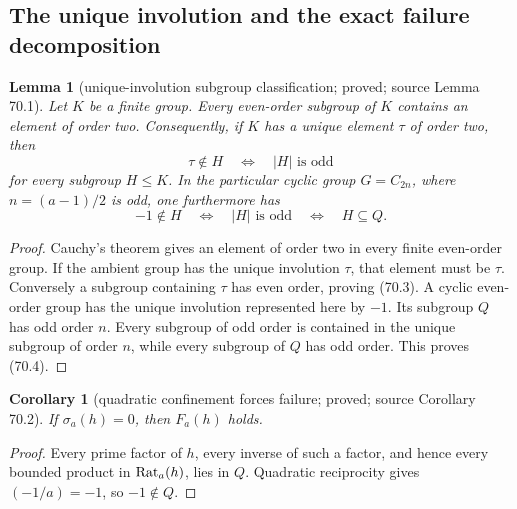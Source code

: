 \documentclass[10pt,reqno]{amsart}
\newtheorem{lemma}[theorem]{Lemma}
\newtheorem{corollary}[theorem]{Corollary}
\theoremstyle{definition}
\newcommand{\1}{\mathbf 1}
\begin{document}
\subsection{The unique involution and the exact failure decomposition}

\begin{lemma}[unique-involution subgroup classification; proved; source Lemma 70.1]\label{lem:a-frame-involution}  Let
$K$ be a finite group.  Every even-order subgroup of $K$ contains an
element of order two.  Consequently, if $K$ has a unique element
$\tau$ of order two, then
\begin{equation}
                 \tau\notin H\quad\Longleftrightarrow\quad |H|\text{ is odd}
                                                               \tag{70.3}
\end{equation}
for every subgroup $H\leq K$.  In the particular cyclic group
$G=C_{2n}$, where $n=(a-1)/2$ is odd, one furthermore has
\begin{equation}
 -1\notin H\quad\Longleftrightarrow\quad |H|\text{ is odd}
             \quad\Longleftrightarrow\quad H\subseteq Q.      \tag{70.4}
\end{equation}

\end{lemma}
\begin{proof} Cauchy's theorem gives an element of order two in every finite
even-order group.  If the ambient group has the unique involution $\tau$,
that element must be $\tau$.  Conversely a subgroup containing $\tau$
has even order, proving (70.3).  A cyclic even-order group has the unique
involution represented here by $-1$.  Its subgroup $Q$ has odd order
$n$.  Every subgroup of odd order is contained in the unique subgroup of
order $n$, while every subgroup of $Q$ has odd order.  This proves
(70.4).
\end{proof}

\begin{corollary}[quadratic confinement forces failure; proved; source Corollary 70.2]\label{cor:quadratic-confinement}  If
$\sigma_a(h)=0$, then $F_a(h)$ holds.

\end{corollary}
\begin{proof} Every prime factor of $h$, every inverse of such a factor, and
hence every bounded product in ${\rm Rat}_a(h)$, lies in $Q$.  Quadratic
reciprocity gives $(-1/a)=-1$, so $-1\notin Q$.
\end{proof}
\end{document}
